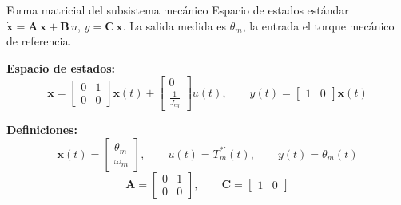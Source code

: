 \documentclass[aspectratio=169,t]{beamer}
\begin{document}
\begin{frame}{Forma matricial del subsistema mecánico}
{\small\color{uncGray}Espacio de estados estándar $\dot{\bm{x}}=\bm{A}\,\bm{x}+\bm{B}\,u$, $y=\bm{C}\,\bm{x}$. La salida medida es $\theta_m$, la entrada el torque mecánico de referencia.}\par
\vspace{3mm}

\textbf{Espacio de estados:}
\begin{equation*}
\dot{\bm{x}} =
\begin{bmatrix} 0 & 1 \\ 0 & 0 \end{bmatrix} \bm{x}(t) +
\begin{bmatrix} 0 \\ \tfrac{1}{J_{eq}} \end{bmatrix} u(t),
\qquad
y(t) = \begin{bmatrix} 1 & 0 \end{bmatrix} \bm{x}(t)
\end{equation*}

\textbf{Definiciones:}
\begin{equation*}
\bm{x}(t)=\begin{bmatrix} \theta_m \\ \omega_m \end{bmatrix},
\qquad
u(t)=T_m^{*\prime}(t),
\qquad
y(t)=\theta_m(t)
\end{equation*}
\begin{equation*}
\bm{A}=\begin{bmatrix} 0 & 1\\ 0 & 0 \end{bmatrix},
\qquad
\bm{C}=\begin{bmatrix} 1 & 0 \end{bmatrix}
\end{equation*}
\end{frame}
\end{document}

